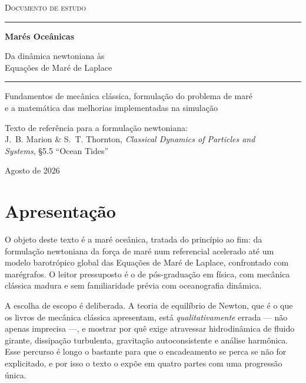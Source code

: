 \documentclass[11pt,a4paper,oneside]{report}
\theoremstyle{definition}
\theoremstyle{plain}
\theoremstyle{remark}
\begin{document}
\begin{titlepage}
\centering
\vspace*{2.4cm}
{\scshape\large Documento de estudo\par}
\vspace{0.4cm}
{\color{azulforte}\rule{\textwidth}{1.2pt}}
\vspace{0.9cm}

{\Huge\bfseries Marés Oceânicas\par}
\vspace{0.6cm}
{\LARGE Da dinâmica newtoniana às\\[2pt] Equações de Maré de Laplace\par}
\vspace{0.9cm}
{\color{azulforte}\rule{\textwidth}{1.2pt}}
\vspace{1.4cm}

{\large Fundamentos de mecânica clássica, formulação do problema de maré\\
e a matemática das melhorias implementadas na simulação\par}

\vfill
{\normalsize Texto de referência para a formulação newtoniana:\\
J.~B. Marion \& S.~T. Thornton, \emph{Classical Dynamics of Particles and\\
Systems}, \S5.5 ``Ocean Tides''\par}
\vspace{1.4cm}
{\large Agosto de 2026\par}
\end{titlepage}

\tableofcontents
\cleardoublepage

\chapter*{Apresentação}

O objeto deste texto é a maré oceânica, tratada do princípio ao fim: da
formulação newtoniana da força de maré num referencial acelerado até um modelo
barotrópico global das Equações de Maré de Laplace, confrontado com marégrafos.
O leitor pressuposto é o de pós-graduação em física, com mecânica clássica
madura e sem familiaridade prévia com oceanografia dinâmica.

A escolha de escopo é deliberada. A teoria de equilíbrio de Newton, que é o que
os livros de mecânica clássica apresentam, está \emph{qualitativamente} errada —
não apenas imprecisa —, e mostrar por quê exige atravessar hidrodinâmica de
fluido girante, dissipação turbulenta, gravitação autoconsistente e análise
harmônica. Esse percurso é longo o bastante para que o encadeamento se perca se
não for explicitado, e por isso o texto o expõe em quatro partes com uma
progressão única.
\end{document}
